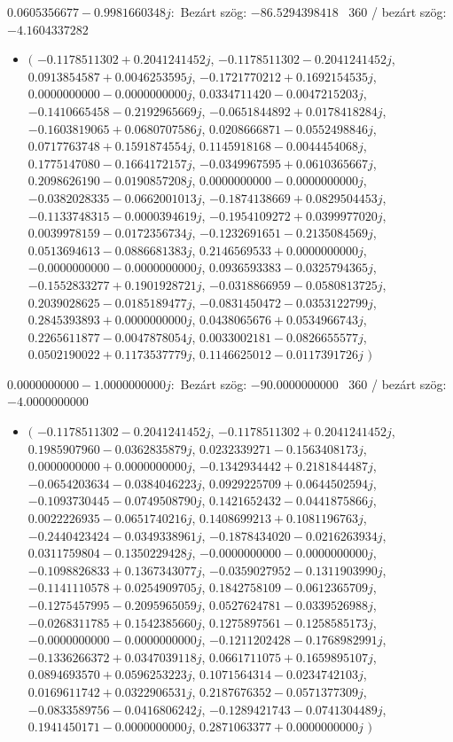 \documentclass[14pt,a4paper]{article}
\begin{document}
$0.0605356677-0.9981660348j$:\
Bezárt szög: $-86.5294398418$ \
360 / bezárt szög: $-4.1604337282$\
\begin{itemize}
\item
$\big($
$-0.1178511302+0.2041241452j$, $-0.1178511302-0.2041241452j$, $0.0913854587+0.0046253595j$, $-0.1721770212+0.1692154535j$, $0.0000000000-0.0000000000j$, $0.0334711420-0.0047215203j$, $-0.1410665458-0.2192965669j$, $-0.0651844892+0.0178418284j$, $-0.1603819065+0.0680707586j$, $0.0208666871-0.0552498846j$, $0.0717763748+0.1591874554j$, $0.1145918168-0.0044454068j$, $0.1775147080-0.1664172157j$, $-0.0349967595+0.0610365667j$, $0.2098626190-0.0190857208j$, $0.0000000000-0.0000000000j$, $-0.0382028335-0.0662001013j$, $-0.1874138669+0.0829504453j$, $-0.1133748315-0.0000394619j$, $-0.1954109272+0.0399977020j$, $0.0039978159-0.0172356734j$, $-0.1232691651-0.2135084569j$, $0.0513694613-0.0886681383j$, $0.2146569533+0.0000000000j$, $-0.0000000000-0.0000000000j$, $0.0936593383-0.0325794365j$, $-0.1552833277+0.1901928721j$, $-0.0318866959-0.0580813725j$, $0.2039028625-0.0185189477j$, $-0.0831450472-0.0353122799j$, $0.2845393893+0.0000000000j$, $0.0438065676+0.0534966743j$, $0.2265611877-0.0047878054j$, $0.0033002181-0.0826655577j$, $0.0502190022+0.1173537779j$, $0.1146625012-0.0117391726j$
$\big)$
\end{itemize}
$0.0000000000-1.0000000000j$:\
Bezárt szög: $-90.0000000000$ \
360 / bezárt szög: $-4.0000000000$\
\begin{itemize}
\item
$\big($
$-0.1178511302-0.2041241452j$, $-0.1178511302+0.2041241452j$, $0.1985907960-0.0362835879j$, $0.0232339271-0.1563408173j$, $0.0000000000+0.0000000000j$, $-0.1342934442+0.2181844487j$, $-0.0654203634-0.0384046223j$, $0.0929225709+0.0644502594j$, $-0.1093730445-0.0749508790j$, $0.1421652432-0.0441875866j$, $0.0022226935-0.0651740216j$, $0.1408699213+0.1081196763j$, $-0.2440423424-0.0349338961j$, $-0.1878434020-0.0216263934j$, $0.0311759804-0.1350229428j$, $-0.0000000000-0.0000000000j$, $-0.1098826833+0.1367343077j$, $-0.0359027952-0.1311903990j$, $-0.1141110578+0.0254909705j$, $0.1842758109-0.0612365709j$, $-0.1275457995-0.2095965059j$, $0.0527624781-0.0339526988j$, $-0.0268311785+0.1542385660j$, $0.1275897561-0.1258585173j$, $-0.0000000000-0.0000000000j$, $-0.1211202428-0.1768982991j$, $-0.1336266372+0.0347039118j$, $0.0661711075+0.1659895107j$, $0.0894693570+0.0596253223j$, $0.1071564314-0.0234742103j$, $0.0169611742+0.0322906531j$, $0.2187676352-0.0571377309j$, $-0.0833589756-0.0416806242j$, $-0.1289421743-0.0741304489j$, $0.1941450171-0.0000000000j$, $0.2871063377+0.0000000000j$
$\big)$
\end{itemize}
\end{document}
